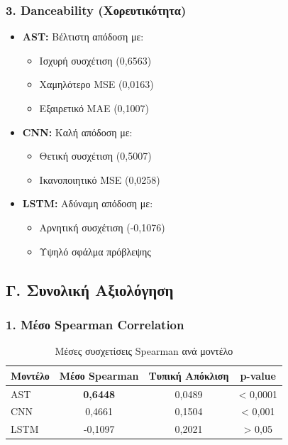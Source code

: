 \documentclass[a4paper,12pt]{article}
\begin{document}
\subsubsection*{3. Danceability (Χορευτικότητα)}
\begin{itemize}
    \item \textbf{AST:} Βέλτιστη απόδοση με:
    \begin{itemize}
        \item Ισχυρή συσχέτιση (0,6563)
        \item Χαμηλότερο MSE (0,0163)
        \item Εξαιρετικό MAE (0,1007)
    \end{itemize}
    
    \item \textbf{CNN:} Καλή απόδοση με:
    \begin{itemize}
        \item Θετική συσχέτιση (0,5007)
        \item Ικανοποιητικό MSE (0,0258)
    \end{itemize}
    
    \item \textbf{LSTM:} Αδύναμη απόδοση με:
    \begin{itemize}
        \item Αρνητική συσχέτιση (-0,1076)
        \item Υψηλό σφάλμα πρόβλεψης
    \end{itemize}
\end{itemize}

\subsection*{Γ. Συνολική Αξιολόγηση}

\subsubsection*{1. Μέσο Spearman Correlation}
\begin{table}[H]
    \centering
    \begin{tabular}{lccc}
    \toprule
    \textbf{Μοντέλο} & \textbf{Μέσο Spearman} & \textbf{Τυπική Απόκλιση} & \textbf{p-value} \\
    \midrule
    AST & \textbf{0,6448} & 0,0489 & < 0,0001 \\
    CNN & 0,4661 & 0,1504 & < 0,001 \\
    LSTM & -0,1097 & 0,2021 & > 0,05 \\
    \bottomrule
    \end{tabular}
    \caption{Μέσες συσχετίσεις Spearman ανά μοντέλο}
\end{table}
\end{document}
